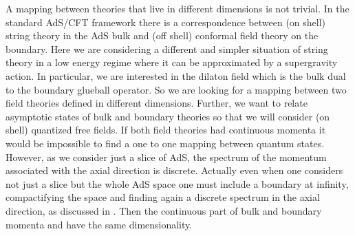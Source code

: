 \documentclass[a4paper,twocolumn,prd,groupedaddress,nofootinbib]{revtex4}
\begin{document}
A mapping between theories that live in different dimensions is not 
trivial. 
In the standard AdS/CFT framework there is a correspondence between  
(on shell) string theory in the AdS bulk and 
(off shell) conformal field theory on the boundary. 
Here we are considering a different and simpler situation of 
string theory in a low energy regime where it can be approximated 
by a supergravity action. 
In particular, we are interested in the dilaton field which 
is the bulk dual to the boundary glueball operator. 
So we are looking for a mapping between two field 
theories defined in different dimensions. 
Further, we want to relate asymptotic states of bulk and boundary 
theories so that we will consider (on shell) quantized free fields. 
If both field theories had continuous momenta it would be impossible
to find a one to one mapping between quantum states. 
However, as we consider just a slice of AdS, 
the spectrum of the momentum associated with the axial 
direction is discrete. 
Actually even when one considers not just a slice but the whole AdS 
space one must include a boundary at infinity, compactifying the space 
and finding again a discrete spectrum in the axial direction, 
as discussed in \cite{BB1}.
Then the continuous part of bulk and boundary momenta 
\coordHE{} and \coordHE{} have the same dimensionality. 
\end{document}

